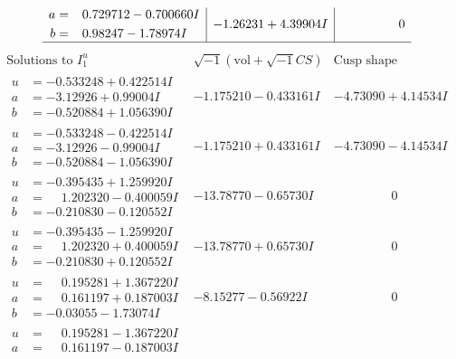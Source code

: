 \documentclass[1p]{elsarticle_modified}
\theoremstyle{definition}
\newcommand{\I}{\sqrt{-1}}
\begin{document}
$$\begin{array}{c|c|c}
\begin{aligned}
a &= \phantom{-}0.729712 - 0.700660 I \\
b &= \phantom{-}0.98247 - 1.78974 I\end{aligned}
 & -1.26231 + 4.39904 I & \phantom{-0.000000 } 0\\
 \hline 
 \end{array}$$\newpage$$\begin{array}{c|c|c}  
\text{Solutions to }I^u_{1}& \I (\text{vol} + \sqrt{-1}CS) & \text{Cusp shape}\\
 \hline 
\begin{aligned}
u &= -0.533248 + 0.422514 I \\
a &= -3.12926 + 0.99004 I \\
b &= -0.520884 + 1.056390 I\end{aligned}
 & -1.175210 - 0.433161 I & -4.73090 + 4.14534 I \\ \hline\begin{aligned}
u &= -0.533248 - 0.422514 I \\
a &= -3.12926 - 0.99004 I \\
b &= -0.520884 - 1.056390 I\end{aligned}
 & -1.175210 + 0.433161 I & -4.73090 - 4.14534 I \\ \hline\begin{aligned}
u &= -0.395435 + 1.259920 I \\
a &= \phantom{-}1.202320 - 0.400059 I \\
b &= -0.210830 - 0.120552 I\end{aligned}
 & -13.78770 - 0.65730 I & \phantom{-0.000000 } 0 \\ \hline\begin{aligned}
u &= -0.395435 - 1.259920 I \\
a &= \phantom{-}1.202320 + 0.400059 I \\
b &= -0.210830 + 0.120552 I\end{aligned}
 & -13.78770 + 0.65730 I & \phantom{-0.000000 } 0 \\ \hline\begin{aligned}
u &= \phantom{-}0.195281 + 1.367220 I \\
a &= \phantom{-}0.161197 + 0.187003 I \\
b &= -0.03055 - 1.73074 I\end{aligned}
 & -8.15277 - 0.56922 I & \phantom{-0.000000 } 0 \\ \hline\begin{aligned}
u &= \phantom{-}0.195281 - 1.367220 I \\
a &= \phantom{-}0.161197 - 0.187003 I \\

\end{aligned}
\end{array}$$
\end{document}
